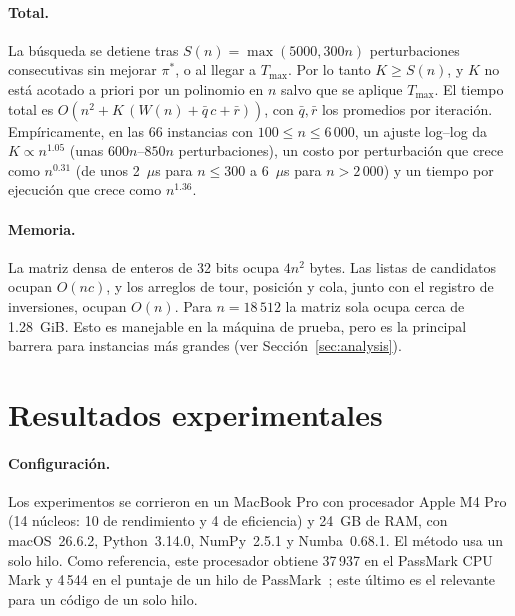 \documentclass[runningheads]{llncs}
\begin{document}
\paragraph{Total.} La búsqueda se detiene tras $S(n)=\max(5000,300n)$
perturbaciones consecutivas sin mejorar $\pi^*$, o al llegar a
$T_{\max}$. Por lo tanto $K\ge S(n)$, y $K$ no está acotado a priori por
un polinomio en $n$ salvo que se aplique $T_{\max}$. El tiempo total es
$O(n^2+K\,(W(n)+\bar q\,c+\bar r))$, con $\bar q,\bar r$ los promedios
por iteración. Empíricamente, en las 66 instancias con
$100\le n\le 6\,000$, un ajuste log--log da $K\propto n^{1.05}$ (unas
$600n$--$850n$ perturbaciones), un costo por perturbación que crece como
$n^{0.31}$ (de unos 2~$\mu$s para $n\le 300$ a 6~$\mu$s para
$n>2\,000$) y un tiempo por ejecución que crece como $n^{1.36}$.

\paragraph{Memoria.} La matriz densa de enteros de 32 bits ocupa $4n^2$
bytes. Las listas de candidatos ocupan $O(nc)$, y los arreglos de tour,
posición y cola, junto con el registro de inversiones, ocupan $O(n)$.
Para $n=18\,512$ la matriz sola ocupa cerca de 1.28~GiB. Esto es
manejable en la máquina de prueba, pero es la principal barrera para
instancias más grandes (ver Sección~\ref{sec:analysis}).

\section{Resultados experimentales}
\label{sec:experiments}

\paragraph{Configuración.}
Los experimentos se corrieron en un MacBook Pro con procesador Apple M4
Pro (14 núcleos: 10 de rendimiento y 4 de eficiencia) y 24~GB de RAM,
con macOS~26.6.2, Python~3.14.0, NumPy~2.5.1 y Numba~0.68.1. El método
usa un solo hilo. Como referencia, este procesador obtiene 37\,937 en
el PassMark CPU Mark y 4\,544 en el puntaje de un hilo de
PassMark~\cite{passmark_m4pro}; este último es el relevante para un
código de un solo hilo.
\end{document}
